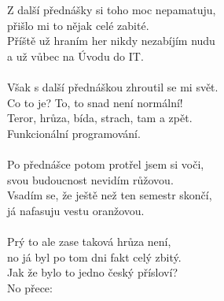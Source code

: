\newpage
Z další přednášky si toho moc nepamatuju,\\
přišlo mi to nějak celé zabité.\\
Příště už hraním her nikdy nezabíjím nudu\\
a už vůbec na Úvodu do IT.
\chorushere\\
\\
Však s další přednáškou zhroutil se mi svět.\\
Co to je? To, to snad není normální!\\
Teror, hrůza, bída, strach, tam a zpět.\\
Funkcionální programování.
\chorushere\\
\\
Po přednášce potom protřel jsem si voči,\\
svou budoucnost nevidím růžovou.\\
Vsadím se, že ještě než ten semestr skončí,\\
já nafasuju vestu oranžovou.\\
\\
Prý to ale zase taková hrůza není,\\
no já byl po tom dni fakt celý zbitý.\\
Jak že bylo to jedno český přísloví?\\
No přece: \\
\\

\newpage
